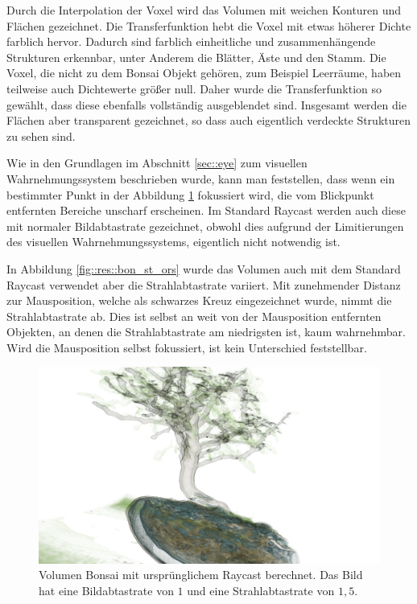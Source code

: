 Durch die Interpolation der Voxel wird das Volumen mit weichen Konturen und Flächen gezeichnet.
Die Transferfunktion hebt die Voxel mit etwas höherer Dichte farblich hervor.
Dadurch sind farblich einheitliche und zusammenhängende Strukturen erkennbar, unter Anderem die Blätter, Äste und den Stamm.
Die Voxel, die nicht zu dem Bonsai Objekt gehören, zum Beispiel Leerräume, haben teilweise auch Dichtewerte größer null.
Daher wurde die Transferfunktion so gewählt, dass diese ebenfalls vollständig ausgeblendet sind.
Insgesamt werden die Flächen aber transparent gezeichnet, so dass auch eigentlich verdeckte Strukturen zu sehen sind.

Wie in den Grundlagen im Abschnitt \ref{sec::eye} zum visuellen Wahrnehmungssystem beschrieben wurde, kann man feststellen, dass wenn ein bestimmter Punkt in der Abbildung \ref{fig::res::bon_st} fokussiert wird, die vom Blickpunkt entfernten Bereiche unscharf erscheinen.
Im Standard Raycast werden auch diese mit normaler Bildabtastrate gezeichnet, obwohl dies aufgrund der Limitierungen des visuellen Wahrnehmungssystems, eigentlich nicht notwendig ist.

In Abbildung \ref{fig::res::bon_st_ors} wurde das Volumen auch mit dem Standard Raycast verwendet aber die Strahlabtastrate variiert.
Mit zunehmender Distanz zur Mausposition, welche als schwarzes Kreuz eingezeichnet wurde, nimmt die Strahlabtastrate ab.
Dies ist selbst an weit von der Mausposition entfernten Objekten, an denen die Strahlabtastrate am niedrigsten ist, kaum wahrnehmbar.
Wird die Mausposition selbst fokussiert, ist kein Unterschied feststellbar.

\begin{landscape}
	\begin{figure}
		\centering
		\includegraphics[width=\textheight]{../../Neue_Messungen/Bonsai/st.png}
		\caption{Volumen Bonsai mit ursprünglichem Raycast berechnet. Das Bild hat eine Bildabtastrate von $1$ und eine Strahlabtastrate von $1,5$.}
		\label{fig::res::bon_st}
	\end{figure}
\end{landscape}

